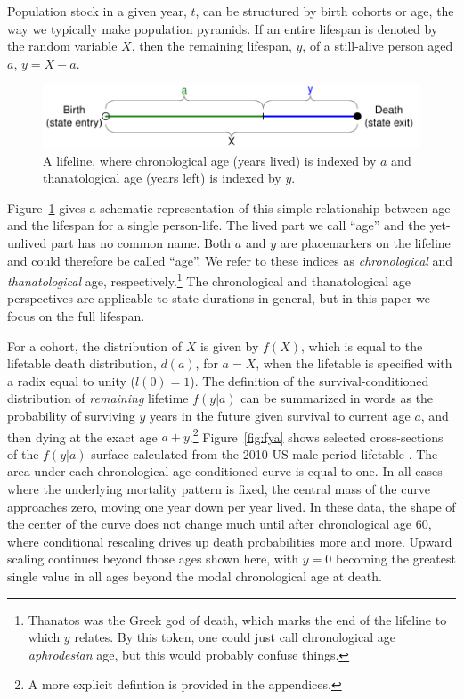 \documentclass{article}
\begin{document}
Population stock in a
 given year, $t$, can be structured by birth cohorts or age, the way we typically make 
 population pyramids. If an entire lifespan is denoted by the random variable
 $X$, then the remaining lifespan, $y$, of a still-alive person aged $a$, $y = X - a$.
\begin{figure}[h]
\centering
	\caption{A lifeline, where chronological age (years lived) is indexed by $a$
	and thanatological age (years left) is indexed by $y$.}
	\label{fig:line}
	\includegraphics[scale=.8]{Figures/LifeLine.pdf}	
\end{figure}
Figure~\ref{fig:line} gives a schematic representation of this simple
relationship between age and the lifespan for a single person-life. The lived
part we call ``age'' and the yet-unlived part has no common name. Both $a$ and $y$ are placemarkers on the
lifeline and could therefore be called ``age''. We refer to these indices as
\textit{chronological} and \textit{thanatological} age, respectively.\footnote{Thanatos was the Greek god of death, which marks the end of the lifeline to which $y$ relates. By this token, one could just call chronological age \textit{aphrodesian} age, but this would probably confuse things.}
The chronological and thanatological age perspectives are applicable to state
durations in general, but in this paper we focus on the full lifespan.

For a cohort, the distribution of $X$ is given by $f(X)$, which is equal to the
lifetable death distribution, $d(a)$, for $a = X$, when the lifetable is
specified with a radix equal to unity ($l(0)=1$).
The definition of the survival-conditioned distribution of \textit{remaining}
lifetime $f(y|a)$ can be summarized in words as the probability of surviving $y$
years in the future given survival to current age $a$, and then dying at the
exact age $a+y$.\footnote{A more explicit defintion is provided in the
appendices.} Figure~\ref{fig:fya} shows selected cross-sections of the $f(y|a)$
surface calculated from the 2010 US male period lifetable . The area under each chronological age-conditioned curve is equal to one.
In all cases where the underlying mortality pattern is fixed, the central mass
of the curve approaches zero, moving one year down per year lived.
In these data, the shape of the center of the curve does not change much until
after chronological age 60, where conditional rescaling drives up death probabilities more and more. Upward
scaling continues beyond those ages shown here, with $y=0$ becoming the greatest
single value in all ages beyond the modal chronological age at death.
\end{document}
